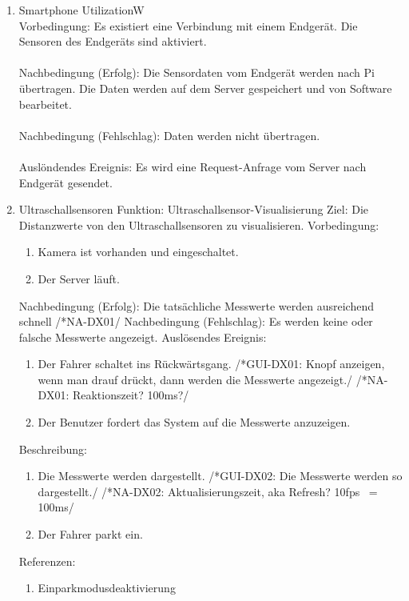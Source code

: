 \documentclass[pflichtenheft.tex]{subfiles}
\begin{document}
\begin{enumerate}
	\item{Smartphone UtilizationW}\\ Vorbedingung: Es existiert eine Verbindung mit einem Endgerät. Die Sensoren des Endgeräts sind aktiviert. \\ \\
		Nachbedingung (Erfolg): Die Sensordaten vom Endgerät werden nach Pi übertragen. Die Daten werden auf dem Server gespeichert und von Software bearbeitet. \\ \\
		Nachbedingung (Fehlschlag): Daten werden nicht übertragen. \\ \\
		Auslöndendes Ereignis: Es wird eine Request-Anfrage vom Server nach Endgerät gesendet.

		\item{Ultraschallsensoren}
	Funktion: Ultraschallsensor-Visualisierung
	Ziel: Die Distanzwerte von den Ultraschallsensoren zu visualisieren.
	Vorbedingung:
		\begin{enumerate}
			\item Kamera ist vorhanden und eingeschaltet.
			\item Der Server läuft.
		\end{enumerate}
	Nachbedingung (Erfolg): Die tatsächliche Messwerte werden ausreichend schnell /*NA-DX01/
	Nachbedingung (Fehlschlag): Es werden keine oder falsche Messwerte angezeigt.
	Auslösendes Ereignis:
		\begin{enumerate}
			\item Der Fahrer schaltet ins Rückwärtsgang. /*GUI-DX01: Knopf anzeigen, wenn man drauf drückt, dann werden die Messwerte angezeigt./ /*NA-DX01: Reaktionszeit? 100ms?/
			\item Der Benutzer fordert das System auf die Messwerte anzuzeigen.
		\end{enumerate}
	Beschreibung:
		\begin{enumerate} 
			\item Die Messwerte werden dargestellt. /*GUI-DX02: Die Messwerte werden so dargestellt./ /*NA-DX02: Aktualisierungszeit, aka Refresh? 10fps ~= 100ms/
			\item Der Fahrer parkt ein.
		\end{enumerate}
	Referenzen:
		\begin{enumerate}
			\item Einparkmodusdeaktivierung
		\end{enumerate}


\end{enumerate}
\end{document}
